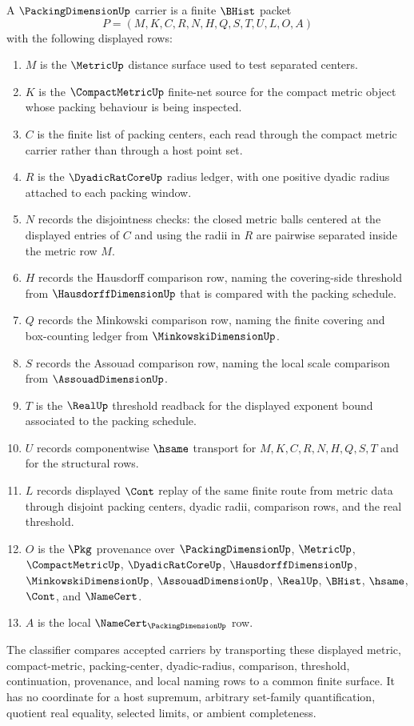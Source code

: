 \begin{definition}
\label{def:packing-dimension-carrier}
A $\PackingDimensionUp$ carrier is a finite $\BHist$ packet
$$
P=(M,K,C,R,N,H,Q,S,T,U,L,O,A)
$$
with the following displayed rows:
\begin{enumerate}
\item $M$ is the $\MetricUp$ distance surface used to test separated centers.
\item $K$ is the $\CompactMetricUp$ finite-net source for the compact metric
object whose packing behaviour is being inspected.
\item $C$ is the finite list of packing centers, each read through the compact
metric carrier rather than through a host point set.
\item $R$ is the $\DyadicRatCoreUp$ radius ledger, with one positive dyadic
radius attached to each packing window.
\item $N$ records the disjointness checks: the closed metric balls centered at
the displayed entries of $C$ and using the radii in $R$ are pairwise separated
inside the metric row $M$.
\item $H$ records the Hausdorff comparison row, naming the covering-side
threshold from $\HausdorffDimensionUp$ that is compared with the packing
schedule.
\item $Q$ records the Minkowski comparison row, naming the finite covering
and box-counting ledger from $\MinkowskiDimensionUp$.
\item $S$ records the Assouad comparison row, naming the local scale
comparison from $\AssouadDimensionUp$.
\item $T$ is the $\RealUp$ threshold readback for the displayed exponent
bound associated to the packing schedule.
\item $U$ records componentwise $\hsame$ transport for $M,K,C,R,N,H,Q,S,T$
and for the structural rows.
\item $L$ records displayed $\Cont$ replay of the same finite route from
metric data through disjoint packing centers, dyadic radii, comparison rows,
and the real threshold.
\item $O$ is the $\Pkg$ provenance over $\PackingDimensionUp$, $\MetricUp$,
$\CompactMetricUp$, $\DyadicRatCoreUp$, $\HausdorffDimensionUp$,
$\MinkowskiDimensionUp$, $\AssouadDimensionUp$, $\RealUp$, $\BHist$,
$\hsame$, $\Cont$, and $\NameCert$.
\item $A$ is the local $\NameCert_{\PackingDimensionUp}$ row.
\end{enumerate}
The classifier compares accepted carriers by transporting these displayed
metric, compact-metric, packing-center, dyadic-radius, comparison, threshold,
continuation, provenance, and local naming rows to a common finite surface. It
has no coordinate for a host supremum, arbitrary set-family quantification,
quotient real equality, selected limits, or ambient completeness.
\end{definition}

